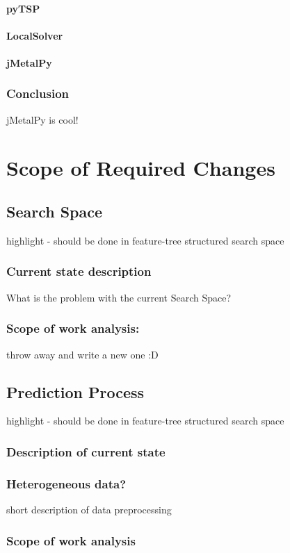 \paragraph{pyTSP}
\paragraph{LocalSolver}
\paragraph{jMetalPy}

\subsubsection{Conclusion}
jMetalPy is cool!


\section{Scope of Required Changes}\label{concept:changes analysis}

\subsection{Search Space} highlight - should be done in feature-tree structured search space
\subsubsection{Current state description} What is the problem with the current Search Space?
\subsubsection{Scope of work analysis:} throw away and write a new one :D

\subsection{Prediction Process} highlight - should be done in feature-tree structured search space
\subsubsection{Description of current state}
\subsubsection{Heterogeneous data?} short description of data preprocessing
\subsubsection{Scope of work analysis} 

